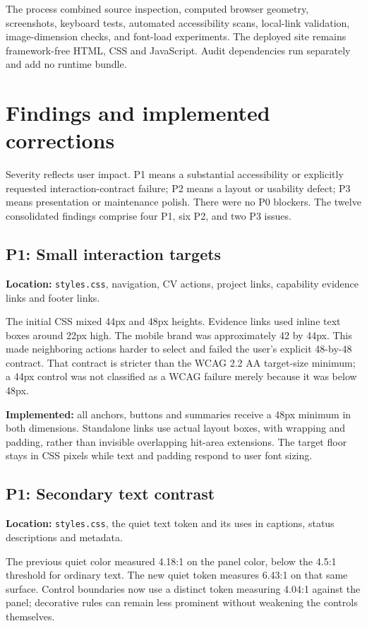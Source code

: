 \documentclass[11pt,a4paper]{article}
\newcommand{\file}[1]{\nolinkurl{#1}}
\begin{document}
The process combined source inspection, computed browser geometry, screenshots, keyboard tests, automated accessibility scans, local-link validation, image-dimension checks, and font-load experiments. The deployed site remains framework-free HTML, CSS and JavaScript. Audit dependencies run separately and add no runtime bundle.

\section{Findings and implemented corrections}
Severity reflects user impact. P1 means a substantial accessibility or explicitly requested interaction-contract failure; P2 means a layout or usability defect; P3 means presentation or maintenance polish. There were no P0 blockers. The twelve consolidated findings comprise four P1, six P2, and two P3 issues.

\subsection{P1: Small interaction targets}
\textbf{Location:} \file{styles.css}, navigation, CV actions, project links, capability evidence links and footer links.

The initial CSS mixed 44px and 48px heights. Evidence links used inline text boxes around 22px high. The mobile brand was approximately 42 by 44px. This made neighboring actions harder to select and failed the user's explicit 48-by-48 contract. That contract is stricter than the WCAG 2.2 AA target-size minimum; a 44px control was not classified as a WCAG failure merely because it was below 48px.

\textbf{Implemented:} all anchors, buttons and summaries receive a 48px minimum in both dimensions. Standalone links use actual layout boxes, with wrapping and padding, rather than invisible overlapping hit-area extensions. The target floor stays in CSS pixels while text and padding respond to user font sizing.

\subsection{P1: Secondary text contrast}
\textbf{Location:} \file{styles.css}, the quiet text token and its uses in captions, status descriptions and metadata.

The previous quiet color measured 4.18:1 on the panel color, below the 4.5:1 threshold for ordinary text. The new quiet token measures 6.43:1 on that same surface. Control boundaries now use a distinct token measuring 4.04:1 against the panel; decorative rules can remain less prominent without weakening the controls themselves.
\end{document}
